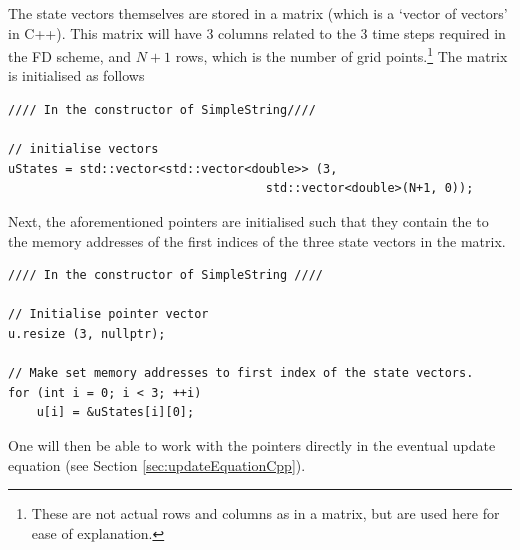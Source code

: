 The state vectors themselves are stored in a matrix (which is a `vector of vectors' in C++). This matrix will have 3 columns related to the 3 time steps required in the FD scheme, and $N+1$ rows, which is the number of grid points.\footnote{These are not actual rows and columns as in a matrix, but are used here for ease of explanation.} The matrix is initialised as follows

\setlstCpp
\begin{lstlisting}[belowskip=-0.5\baselineskip]
//// In the constructor of SimpleString////

// initialise vectors
uStates = std::vector<std::vector<double>> (3, 
                                    std::vector<double>(N+1, 0));
\end{lstlisting}
%
Next, the aforementioned pointers are initialised such that they contain the to the memory addresses of the first indices of the three state vectors in the matrix.

\begin{lstlisting}[belowskip=-0.5\baselineskip]
//// In the constructor of SimpleString ////

// Initialise pointer vector
u.resize (3, nullptr);

// Make set memory addresses to first index of the state vectors.
for (int i = 0; i < 3; ++i)
    u[i] = &uStates[i][0];
\end{lstlisting}
One will then be able to work with the pointers directly in the eventual update equation (see Section \ref{sec:updateEquationCpp}).

